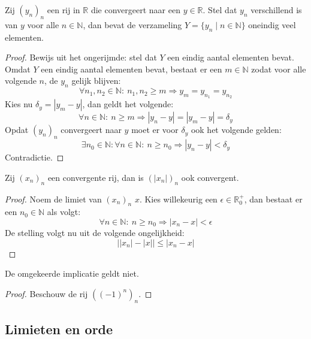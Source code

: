 \documentclass[main.tex]{subfiles}
\begin{document}
\begin{st}
  Zij $(y_{n})_{n}$ een rij in $\mathbb{R}$ die convergeert naar een $y\in \mathbb{R}$.
  Stel dat $y_{n}$ verschillend is van $y$ voor alle $n\in \mathbb{N}$, dan bevat de verzameling $Y = \{y_{n}\mid n\in \mathbb{N}\}$ oneindig veel elementen.

  \begin{proof}
    Bewijs uit het ongerijmde: stel dat $Y$ een eindig aantal elementen bevat.\\
    Omdat $Y$ een eindig aantal elementen bevat, bestaat er een $m\in \mathbb{N}$ zodat voor alle volgende $n$, de $y_{n}$ gelijk blijven:
    \[ \forall n_{1},n_{2}\in \mathbb{N}:\ n_{1},n_{2} \ge m \Rightarrow y_{m} = y_{n_{1}} = y_{n_{2}} \]
    Kies nu $\delta_{y} = |y_{m}-y|$, dan geldt het volgende:
    \[ \forall n\in \mathbb{N}:\ n \ge m \Rightarrow |y_{n}-y| = |y_{m}-y| = \delta_{y} \]
    Opdat $(y_{n})_{n}$ convergeert naar $y$ moet er voor $\delta_{y}$ ook het volgende gelden:
    \[ \exists n_{0} \in \mathbb{N}: \forall n \in \mathbb{N}:\ n \ge n_{0} \Rightarrow |y_{n}-y| < \delta_{y} \]
    Contradictie.
\feed
  \end{proof}
\end{st}

\begin{st}
  Zij $(x_{n})_{n}$ een convergente rij, dan is $(|x_{n}|)_{n}$ ook convergent.

  \begin{proof}
    Noem de limiet van $(x_{n})_{n}$ $x$.
    Kies willekeurig een $\epsilon\in\mathbb{R}_{0}^{+}$, dan bestaat er een $n_{0}\in\mathbb{N}$ als volgt:
    \[ \forall n\in\mathbb{N}:\ n\ge n_{0} \Rightarrow |x_{n}-x| < \epsilon \]
    De stelling volgt nu uit de volgende ongelijkheid:
    \[ \left| |x_{n}| - |x| \right| \le |x_{n}-x| \]
  \end{proof}
\end{st}

\begin{tvb}
  De omgekeerde implicatie geldt niet.
  
  \begin{proof}
    Beschouw de rij $((-1)^{n})_{n}$.
  \end{proof}
\end{tvb}


\subsection{Limieten en orde}
\label{sec:limieten-en-orde}
\end{document}
